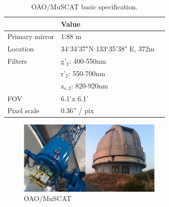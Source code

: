 \begin{table}
\centering
\caption{OAO/MuSCAT basic specification.} \label{tab:muscat}
\begin{tabular}{lll} \hline
             &Value      \\ 
\hline
Primary mirror & 1.88 m \\
Location       & 34$^{\circ}$34'37"N 133$^{\circ}$35'38" E, 372m \\
Filters  \multirow{3}{*}{} & g'$_2$: 400-550nm \\
                           & r'$_2$: 550-700nm \\
                           & z$_{s,2}$: 820-920nm \\
FOV    & 6.1'x 6.1' \\
Pixel scale & 0.36'' / pix \\ 
\hline
\end{tabular}
\end{table}

\begin{figure}
\centering
\includegraphics[width=7cm]{figures/oao-muscat.png}
\caption{OAO/MuSCAT}
\label{fig:muscat}
\end{figure}



